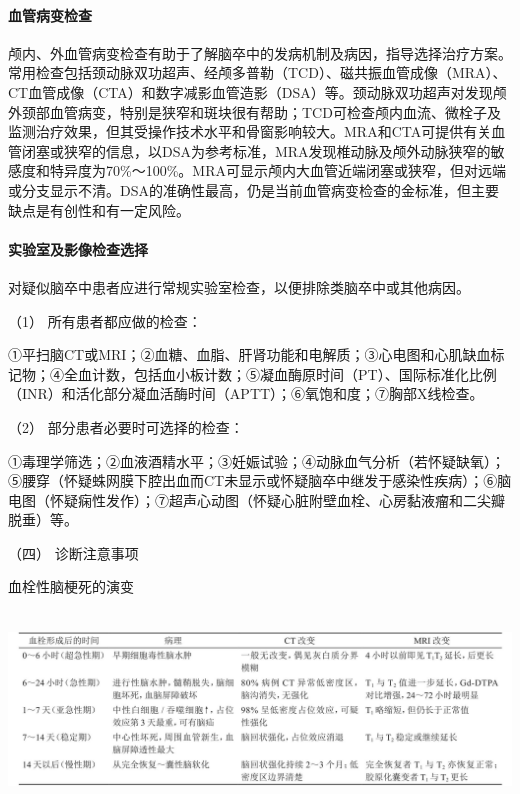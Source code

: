 \paragraph{血管病变检查}

颅内、外血管病变检查有助于了解脑卒中的发病机制及病因，指导选择治疗方案。常用检查包括颈动脉双功超声、经颅多普勒（TCD）、磁共振血管成像（MRA）、CT血管成像（CTA）和数字减影血管造影（DSA）等。颈动脉双功超声对发现颅外颈部血管病变，特别是狭窄和斑块很有帮助；TCD可检查颅内血流、微栓子及监测治疗效果，但其受操作技术水平和骨窗影响较大。MRA和CTA可提供有关血管闭塞或狭窄的信息，以DSA为参考标准，MRA发现椎动脉及颅外动脉狭窄的敏感度和特异度为70\%～100\%。MRA可显示颅内大血管近端闭塞或狭窄，但对远端或分支显示不清。DSA的准确性最高，仍是当前血管病变检查的金标准，但主要缺点是有创性和有一定风险。

\paragraph{实验室及影像检查选择}

对疑似脑卒中患者应进行常规实验室检查，以便排除类脑卒中或其他病因。

\hypertarget{text00242.htmlux5cux23CHP8-1-2-2-1-3-3-1}{}
（1） 所有患者都应做的检查：

①平扫脑CT或MRI；②血糖、血脂、肝肾功能和电解质；③心电图和心肌缺血标记物；④全血计数，包括血小板计数；⑤凝血酶原时间（PT）、国际标准化比例（INR）和活化部分凝血活酶时间（APTT）；⑥氧饱和度；⑦胸部X线检查。

\hypertarget{text00242.htmlux5cux23CHP8-1-2-2-1-3-3-2}{}
（2） 部分患者必要时可选择的检查：

①毒理学筛选；②血液酒精水平；③妊娠试验；④动脉血气分析（若怀疑缺氧）；⑤腰穿（怀疑蛛网膜下腔出血而CT未显示或怀疑脑卒中继发于感染性疾病）；⑥脑电图（怀疑痫性发作）；⑦超声心动图（怀疑心脏附壁血栓、心房黏液瘤和二尖瓣脱垂）等。

\hypertarget{text00242.htmlux5cux23CHP8-1-2-2-1-4}{}
（四） 诊断注意事项

\begin{table}[htbp]
\centering
\caption{血栓性脑梗死的演变}
\label{tab84-1}
\includegraphics[width=6.72917in,height=2.04167in]{./images/Image00370.jpg}
\end{table}

